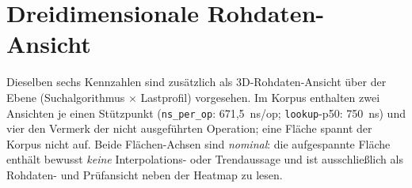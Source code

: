 \section{Dreidimensionale Rohdaten-Ansicht}\label{sec:measurements:surfaces3d}

Dieselben sechs Kennzahlen sind zusätzlich als 3D-Rohdaten-Ansicht über der Ebene
(Suchalgorithmus $\times$ Lastprofil) vorgesehen. Im Korpus enthalten zwei Ansichten je einen Stützpunkt
(\texttt{ns\_per\_op}: 671,5~ns/op; \texttt{lookup}-p50: 750~ns) und vier den Vermerk der nicht
ausgeführten Operation; eine Fläche spannt der Korpus nicht auf. Beide Flächen-Achsen sind
\emph{nominal}: die aufgespannte Fläche enthält bewusst \emph{keine} Interpolations- oder Trendaussage
und ist ausschließlich als Rohdaten- und Prüfansicht neben der Heatmap zu lesen.

